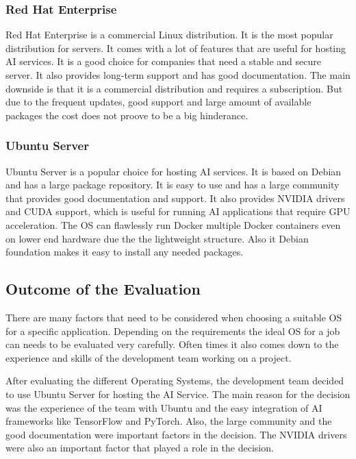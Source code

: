 \cite{LinuxForServerDebian}

\subsubsection{Red Hat Enterprise}

Red Hat Enterprise is a commercial Linux distribution. It is the most popular distribution for servers. It comes with a lot of features that are useful for hosting AI services. It is a good choice for companies that need a stable and secure server. It also provides long-term support and has good documentation.
The main downside is that it is a commercial distribution and requires a subscription. But due to the frequent updates, good support and large amount of available packages the cost does not proove to be a big hinderance.

\cite{LinuxForServerRedhat}

\subsubsection{Ubuntu Server}

Ubuntu Server is a popular choice for hosting AI services. It is based on Debian and has a large package repository. It is easy to use and has a large community that provides good documentation and support. It also provides NVIDIA drivers and CUDA support, which is useful for running AI applications that require GPU acceleration.
The OS can flawlessly run Docker multiple Docker containers even on lower end hardware due the the lightweight structure. Also it Debian foundation makes it easy to install any needed packages. 

\cite{LinuxForServerUbuntu} 

\subsection {Outcome of the Evaluation}

There are many factors that need to be considered when choosing a suitable OS for a specific application. Depending on the requirements the ideal OS for a job can needs to be evaluated very carefully. 
Often times it also comes down to the experience and skills of the development team working on a project. 

After evaluating the different Operating Systems, the development team decided to use Ubuntu Server for hosting the AI Service.
The main reason for the decision was the experience of the team with Ubuntu and the easy integration of AI frameworks like TensorFlow and PyTorch.
Also, the large community and the good documentation were important factors in the decision. The NVIDIA drivers were also an important factor that played a role in the decision.


